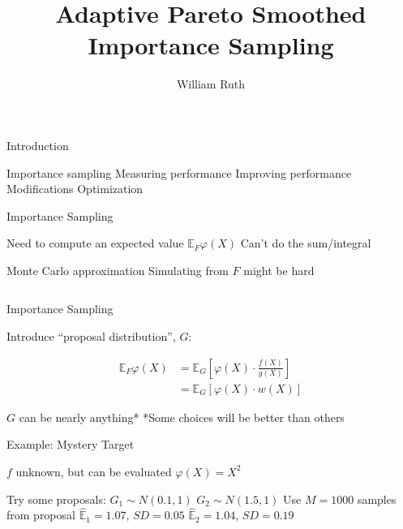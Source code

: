 \documentclass[14pt]{beamer}
\title[]{Adaptive Pareto Smoothed Importance Sampling}
\author{William Ruth}
\institute[]{Joint work with Payman Nickchi}
\date{\vspace{-3cm}}
\newcommand{\bE}{\mathbb{E}}
\begin{document}
\begin{frame}
    \titlepage
\end{frame}

\begin{frame}{Introduction}
    \begin{outline}
        \1 Importance sampling \newline
        \1 Measuring performance \newline
        \1 Improving performance
            \2 Modifications
            \2 Optimization
    \end{outline}
\end{frame}


\begin{frame}{Importance Sampling}
    \begin{outline}
        \1 Need to compute an expected value
            \2 $\bE_F \varphi(X)$
        \1 Can't do the sum/integral \newline

        \1 Monte Carlo approximation
            \2 Simulating from $F$ might be hard
    \end{outline}
    \begin{equation*}
    \end{equation*}
\end{frame}

\begin{frame}{Importance Sampling}
    \begin{outline}
        \1 Introduce ``proposal distribution'', $G$:
    \end{outline}
    \begin{align*}
        \bE_F \varphi(X) &=  \bE_G \left[ \varphi(X) \cdot \frac{f(X)}{g(X)} \right] \\
        &=  \bE_G \left[ \varphi(X) \cdot w(X) \right]
    \end{align*}
    \begin{outline}
        \1 $G$ can be nearly anything*
            \2 *Some choices will be better than others
    \end{outline}
\end{frame}

\begin{frame}{Example: Mystery Target}
    \begin{outline}
        \1 $f$ unknown, but can be evaluated 
        \1 $\varphi(X) = X^2$ \newline

        \1 Try some proposals:
            \2 $G_1 \sim N(0.1,1)$
            \2 $G_2 \sim N(1.5,1)$ \newline
        \1 Use $M=1000$ samples from proposal
            \2 $\hat{\bE}_1 = 1.07$, $SD = 0.05$
            \2 $\hat{\bE}_2 = 1.04$, $SD = 0.19$
    \end{outline}    
\end{frame}
\end{document}
